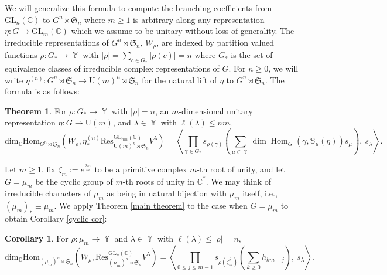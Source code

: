 \documentclass[12pt,reqno]{amsart}
\theoremstyle{definition}
\newtheorem*{thm*}{Theorem}
\newtheorem*{cor*}{Corollary}
\DeclareMathOperator{\Par}{\mathbb{Y}}
\DeclareMathOperator{\Hom}{\mathrm{Hom}}
\begin{document}
We will generalize this formula to compute the branching coefficients from $\mathrm{GL}_n(\mathbb{C})$ to $G^n \rtimes \mathfrak{S}_n$ where $m \geq 1$ is arbitrary along any representation $\eta: G \rightarrow \mathrm{GL}_m(\mathbb{C})$ which we assume to be unitary without loss of generality. The irreducible representations of $G^n \rtimes \mathfrak{S}_n$, $W_{\rho}$, are indexed by partition valued functions $\rho:G_* \rightarrow \Par$ with $|\rho| = \sum_{c \in G_*} |\rho(c)| = n$ where $G_*$ is the set of equivalence classes of irreducible complex representations of $G$. For $n\geq 0$, we will write $\eta^{(n)}:G^n \rtimes \mathfrak{S}_n \rightarrow \mathrm{U}(m)^{n} \rtimes \mathfrak{S}_n$ for the natural lift of $\eta$ to $G^n \rtimes \mathfrak{S}_n.$ The formula is as follows:

\begin{thm*}
For $\rho: G_* \rightarrow \Par$ with $|\rho| = n$, an $m$-dimensional unitary representation $\eta: G \rightarrow \mathrm{U}(m)$, and $\lambda \in \Par$ with $\ell(\lambda) \leq n m ,$
    $$\mathrm{dim}_{\mathbb{C}} \mathrm{Hom}_{G^{n} \rtimes \mathfrak{S}_n}\left( W_{\rho}, \eta^{(n)}_*\mathrm{Res}^{\mathrm{GL}_{nm}(\mathbb{C})}_{\mathrm{U}(m)^{n} \rtimes \mathfrak{S}_n} V^{\lambda} \right)= \left\langle \prod_{\gamma \in G_*} s_{\rho(\gamma)}\left(\sum_{\mu \in \Par} \dim \Hom_{G}(\gamma, \mathbb{S}_{\mu}(\eta)) s_{\mu}\right), ~ s_{\lambda} \right\rangle.$$
\end{thm*}

Let $m \geq 1$, fix $\zeta_m:= e^{\frac{2 \pi i}{m}}$ to be a primitive complex $m$-th root of unity, and let $G = \mu_m$ be the cyclic group of $m$-th roots of unity in $\mathbb{C}^*$. We may think of irreducible characters of $\mu_m$ as being in natural bijection with $\mu_m$ itself, i.e., $(\mu_m)_* \equiv \mu_m.$ We apply Theorem \ref{main theorem} to the case when $G = \mu_m$ to obtain Corollary \ref{cyclic cor}:

\begin{cor*}
For $\rho: \mu_m \rightarrow \Par$ and $\lambda \in \Par$ with $\ell(\lambda) \leq |\rho|= n,$
    $$\mathrm{dim}_{\mathbb{C}} \mathrm{Hom}_{(\mu_m)^{n} \rtimes \mathfrak{S}_n}\left( W_{\rho}, \mathrm{Res}^{\mathrm{GL}_n(\mathbb{C})}_{(\mu_m)^{n} \rtimes \mathfrak{S}_n} V^{\lambda} \right) = \left\langle \prod_{0\leq j \leq m-1} s_{\rho(\zeta_m^j)}\left( \sum_{k \geq 0} h_{km+j}\right), ~ s_{\lambda} \right\rangle.$$
\end{cor*}
\end{document}
